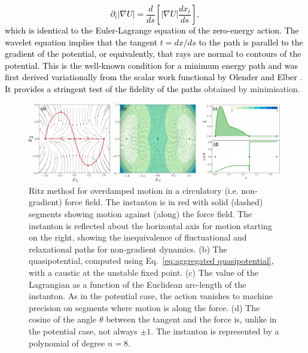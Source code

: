 \textcolor{black}{
\[
\partial_{i}|\nabla U|=\frac{d}{ds}\left[|\nabla U|\frac{dx_{i}}{ds}\right],
\]
which is identical to the Euler-Lagrange equation of the zero-energy
action. The wavelet equation implies that the tangent $t=dx/ds$ to
the path is parallel to the gradient of the potential, or equivalently,
that rays are normal to contours of the potential. This is the well-known
condition for a minimum energy path and was first derived variationally
from the scalar work functional by Olender and Elber \citep{olender1997yet}.
It provides a stringent test of the fidelity of the paths }obtained
by minimisation. 
\begin{figure}
\begin{centering}
\includegraphics[width=0.99\textwidth]{figs_part1/pyritz/fig2.jpeg}
\par\end{centering}
\caption{Ritz method for overdamped motion in a circulatory (i.e. non-gradient)
force field. The instanton is in red with solid (dashed) segments
showing motion against (along) the force field. The instanton is reflected
about the horizontal axis for motion starting on the right, showing
the inequivalence of fluctuational and relaxational paths for non-gradient
dynamics. (b) The quasipotential, computed using Eq.~\ref{eq:aggregated quasipotential},
with a caustic at the unstable fixed point. (c) The value of the Lagrangian
as a function of the Euclidean arc-length of the instanton. As in
the potential case, the action vanishes to machine precision on segments
where motion is along the force. (d) The cosine of the angle $\theta$
between the tangent and the force is, unlike in the potential case,
not always $\pm1$. The instanton is represented by a polynomial of
degree $n=8.$ }

\label{fig:maier-stein-quasipotentials}
\end{figure}

